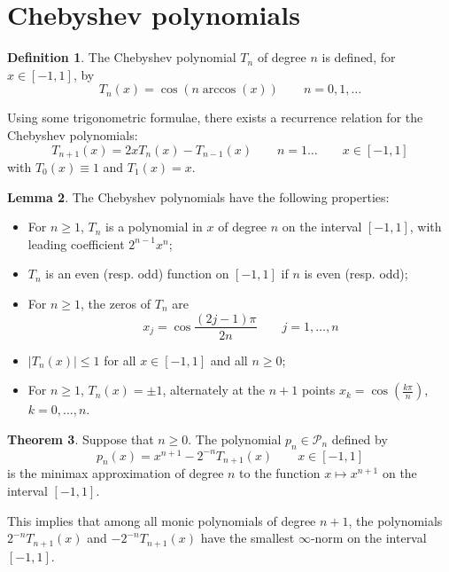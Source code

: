 \documentclass[12pt, openany]{report}
\theoremstyle{definition}
\newtheorem{thm}{Theorem}[chapter]
\newtheorem{definition}[thm]{Definition}
\newtheorem{lem}[thm]{Lemma}
\begin{document}
\section{Chebyshev polynomials}
\begin{definition}
    The Chebyshev polynomial $T_n$ of degree $n$ is defined, for $x\in [-1,1]$, by 
    \begin{equation}
        T_n(x) = \cos(n\arccos(x)) \qquad n=0,1,\dots
    \end{equation}
\end{definition}
Using some trigonometric formulae, there exists a recurrence relation for the Chebyshev polynomials:
\begin{equation}
    T_{n+1}(x) = 2xT_n(x)-T_{n-1}(x)\qquad n=1\dots \qquad x\in [-1,1]
\end{equation}
with $T_0(x) \equiv 1$ and $T_1(x) = x$.
\begin{lem}
    The Chebyshev polynomials have the following properties:
    \begin{itemize}
        \item For $n\ge 1$, $T_n$ is a polynomial in $x$ of degree $n$ on the interval $[-1,1]$, with leading coefficient $2^{n-1}x^n$;
        \item $T_n$ is an even (resp. odd) function on $[-1,1]$ if $n$ is even (resp. odd);
        \item For $n\ge 1$, the zeros of $T_n$ are 
        \begin{equation}
            x_j = \cos\frac{(2j-1)\pi}{2n}\qquad j=1,\dots,n
        \end{equation}
        \item $|T_n(x)| \le 1$ for all $x\in [-1,1]$ and all $n\ge 0$;
        \item For $n\ge1$, $T_n(x) = \pm 1$, alternately at the $n+1$ points $x_k = \cos(\frac{k\pi}{n})$, $k=0,\dots,n$.
    \end{itemize}
\end{lem}
\begin{thm}
    Suppose that $n\ge 0$. The polynomial $p_n\in \mathcal{P}_n$ defined by 
    \begin{equation}
        p_n(x) = x^{n+1}-2^{-n}T_{n+1}(x) \qquad x\in [-1,1]
    \end{equation}
    is the minimax approximation of degree $n$ to the function $x\mapsto x^{n+1}$ on the interval $[-1,1]$.
\end{thm}
This implies that among all monic polynomials of degree $n+1$, the polynomials $2^{-n}T_{n+1}(x)$ and $-2^{-n}T_{n+1}(x)$ have the smallest $\infty$-norm on the interval $[-1,1]$.
\end{document}
